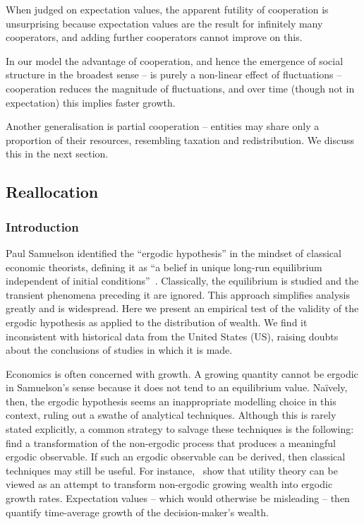 When judged on expectation values, the apparent futility of cooperation is unsurprising
because expectation values are the result for infinitely 
many cooperators, and adding further cooperators cannot improve on this.

In our model the advantage of cooperation, and hence the emergence
of social structure in the broadest sense -- is purely a non-linear 
effect of fluctuations -- cooperation reduces the magnitude of 
fluctuations, and over time (though not in expectation) this implies faster growth. 


Another generalisation is partial cooperation -- entities may share only
a proportion of their resources, resembling taxation and redistribution. We discuss this in
the next section.
\FloatBarrier

\subsection{Reallocation}\label{reallocation}
\subsubsection{Introduction}\label{sec:introduction}
Paul Samuelson identified the ``ergodic hypothesis'' in the mindset of classical economic theorists, defining it as ``a belief in unique long-run equilibrium independent of initial conditions''~\cite[pp.~11-12]{Samuelson1968}. Classically, the equilibrium is studied and the transient phenomena preceding it are ignored. This approach simplifies analysis greatly and is widespread. Here we present an empirical test of the validity of the ergodic hypothesis as applied to the distribution of wealth. We find it inconsistent with historical data from the United States (US), raising doubts about the conclusions of studies in which it is made.

Economics is often concerned with growth. A growing quantity cannot be ergodic in Samuelson's sense because it does not tend to an equilibrium value. Na\"ively, then, the ergodic hypothesis seems an inappropriate modelling choice in this context, ruling out a swathe of analytical techniques. Although this is rarely stated explicitly, a common strategy to salvage these techniques is the following: find a transformation of the non-ergodic process that produces a meaningful ergodic observable. 
If such an ergodic observable can be derived, then classical techniques may still be useful. For instance,~\cite{PetersGell-Mann2016} show that utility theory can be viewed as an attempt to transform non-ergodic growing wealth into ergodic growth rates. Expectation values -- which would otherwise be misleading -- then quantify time-average growth of the decision-maker's wealth.

